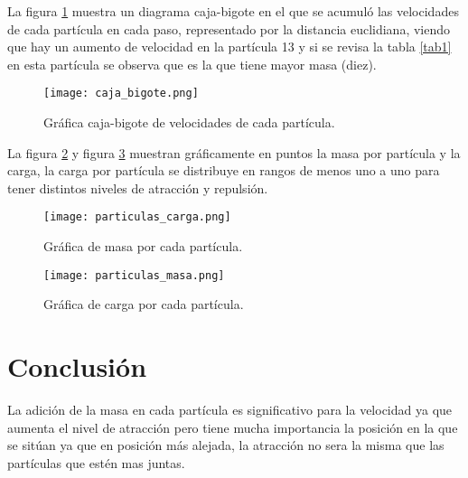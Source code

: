 \documentclass[a4paper, 11pt]{article}
\begin{document}
La figura \ref{f1} muestra un diagrama caja-bigote en el que se acumuló las velocidades de cada partícula en cada paso, representado por la distancia euclidiana, viendo que hay un aumento de velocidad en la partícula 13 y si se revisa la tabla \ref{tab1} en esta partícula se observa que es la que tiene mayor masa (diez).
\begin{figure}[H]
  \centering      
  \texttt{[image: caja\_bigote.png]}
  \caption{Gráfica caja-bigote de velocidades de cada partícula.}
  \label{f1}
\end{figure}
\bigskip

La figura \ref{f2} y figura \ref{f3} muestran gráficamente en puntos la masa por partícula y la carga, la carga por partícula se distribuye en rangos de menos uno a uno para tener distintos niveles de atracción y repulsión.
\begin{figure}[H]
  \centering      
  \texttt{[image: particulas\_carga.png]}
  \caption{Gráfica de masa por cada partícula.}
  \label{f2}
\end{figure}
\bigskip

\begin{figure}[H]
  \centering      
  \texttt{[image: particulas\_masa.png]}
  \caption{Gráfica de carga por cada partícula.}
  \label{f3}
\end{figure}
\bigskip

\section{Conclusión}
La adición de la masa en cada partícula es significativo para la velocidad ya que aumenta el nivel de atracción pero tiene mucha importancia la posición en la que se sitúan ya que en posición más alejada, la atracción no sera la misma que las partículas que estén mas juntas.



\end{document}

